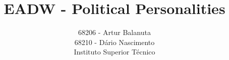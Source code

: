 \documentclass[times, 12pt,twocolumn]{article}
\begin{document}
\title{EADW - Political Personalities}

\author{68206 - Artur Balanuta \\ 68210 - Dário Nascimento \\ Instituto Superior Técnico }
\maketitle
\thispagestyle{empty}














\nocite{ex1, Ghemawat2003}


\end{document}
